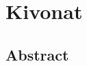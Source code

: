 \chapter*{Kivonat}

\vfill

\begin{otherlanguage}{english}
\chapter*{Abstract}

\end{otherlanguage}
